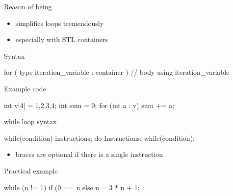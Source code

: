 \begin{frame}[fragile]
  \begin{block}{Reason of being}
    \begin{itemize}
    \item simplifies loops tremendously
    \item especially with STL containers
    \end{itemize}
  \end{block}
  \begin{block}{Syntax}
    \begin{cppcode*}{}
      for ( type iteration_variable : container ) {
        // body using iteration_variable
      }
    \end{cppcode*}
  \end{block}
  \begin{exampleblock}{Example code}
    \begin{cppcode*}{}
      int v[4] = {1,2,3,4};
      int sum = 0;
      for (int a : v) { sum += a; }
    \end{cppcode*}
  \end{exampleblock}
\end{frame}

\begin{frame}[fragile]
  \begin{block}{while loop syntax}
    \begin{cppcode*}{}
      while(condition) {
        instructions;
      }
      do {
        Instructions;
      } while(condition);
    \end{cppcode*}
    \vspace{-0.3cm}
    \begin{itemize}
      \item braces are optional if there is a single instruction
    \end{itemize}
  \end{block}
  \pause
  \begin{exampleblock}{Practical example}
    \begin{cppcode*}{}
      while (n != 1)
        if (0 == n%
        else n = 3 * n + 1;
    \end{cppcode*}
  \end{exampleblock}
\end{frame}

